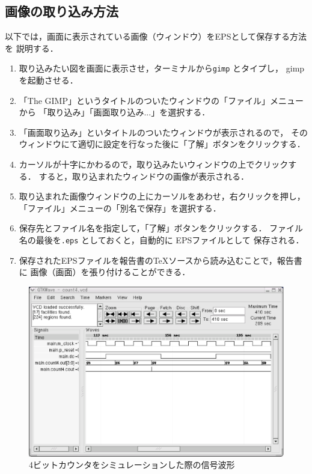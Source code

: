 \documentclass{jarticle}[11pt]
\begin{document}
\subsection{画像の取り込み方法}
\label{subsec:画像の取り込み方法}
以下では，画面に表示されている画像（ウィンドウ）をEPSとして保存する方法を
説明する．
\begin{enumerate}
\item 取り込みたい図を画面に表示させ，ターミナルから{\tt gimp} とタイプし，
gimp を起動させる．
\item 「The GIMP」というタイトルのついたウィンドウの「ファイル」メニューから
「取り込み」「画面取り込み...」を選択する．
\item 「画面取り込み」といタイトルのついたウィンドウが表示されるので，
そのウィンドウにて適切に設定を行なった後に「了解」ボタンをクリックする．
\item カーソルが十字にかわるので，取り込みたいウィンドウの上でクリックする．
すると，取り込まれたウィンドウの画像が表示される．
\item 取り込まれた画像ウィンドウの上にカーソルをあわせ，右クリックを押し，
「ファイル」メニューの「別名で保存」を選択する．
\item 保存先とファイル名を指定して，「了解」ボタンをクリックする．
ファイル名の最後を{\tt .eps} としておくと，自動的に EPSファイルとして
保存される．
\item 保存されたEPSファイルを報告書のTeXソースから読み込むことで，報告書に
画像（画面）を張り付けることができる．
\end{enumerate}


\begin{figure}[htbp]
\begin{center}
\includegraphics[scale=0.5]{count4_gtkwave.eps}
\caption{4ビットカウンタをシミュレーションした際の信号波形}
\label{fig:4ビットカウンタをシミュレーションした際の信号波形}
\end{center}
\end{figure}
\end{document}
